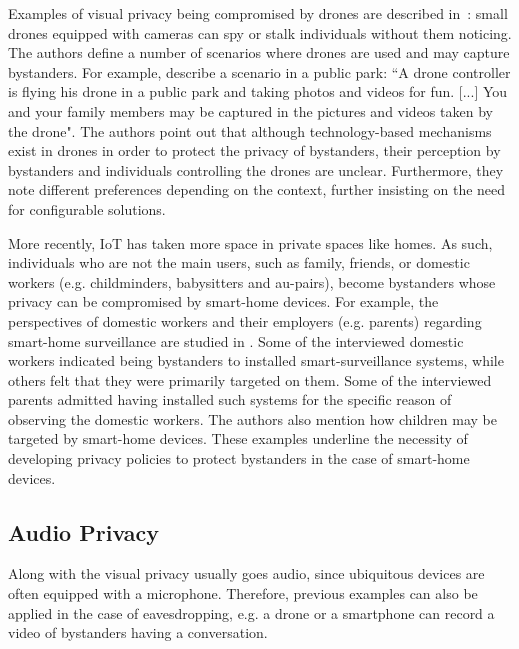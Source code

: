 \documentclass[conference, 11pt]{IEEEtran}
\begin{document}
Examples of visual privacy being compromised by drones are described in~\cite{yao2017privacy}: small drones equipped with cameras can spy or stalk individuals without them noticing. The authors define a number of scenarios where drones are used and may capture bystanders. For example, describe a scenario in a public park: ``A drone controller is flying his drone in a public park and taking photos and videos for fun. [...] You and your family members may be captured in the pictures and videos taken by the drone". The authors point out that although technology-based mechanisms exist in drones in order to protect the privacy of bystanders, their perception by bystanders and individuals controlling the drones are unclear. Furthermore, they note different preferences depending on the context, further insisting on the need for configurable solutions.

More recently, \ac{IoT} has taken more space in private spaces like homes. As such, individuals who are not the main users, such as family, friends, or domestic workers (e.g. childminders, babysitters and au-pairs), become bystanders whose privacy can be compromised by smart-home devices. For example, the perspectives of domestic workers and their employers (e.g. parents) regarding smart-home surveillance are studied in \cite{bernd2020bystanders}. Some of the interviewed domestic workers indicated being bystanders to installed smart-surveillance systems, while others felt that they were primarily targeted on them. Some of the interviewed parents admitted having installed such systems for the specific reason of observing the domestic workers. The authors also mention how children may be targeted by smart-home devices. These examples underline the necessity of developing privacy policies to protect bystanders in the case of smart-home devices.

\subsection{Audio Privacy}\label{Audio}
Along with the visual privacy usually goes audio, since ubiquitous devices are often equipped with a microphone. Therefore, previous examples can also be applied in the case of eavesdropping, e.g. a drone or a smartphone can record a video of bystanders having a conversation. 
\end{document}
